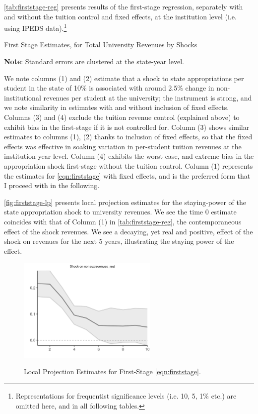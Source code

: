 \documentclass[notitlepage,12pt]{article}
\begin{document}
\autoref{tab:firststage-reg} presents results of the first-stage regression, separately with and without the tuition control and fixed effects, at the institution level (i.e. using IPEDS data).\footnote{
    Representations for frequentist significance levels (i.e. 10, 5, 1\% etc.) are omitted here, and in all following tables.
}
\begin{table}[!h]
    \onehalfspacing
    \centering
    \caption{First Stage Estimates, for Total University Revenues by Shocks}
    \makebox[\textwidth][c]{}
    \label{tab:firststage-reg}
    \begin{flushleft}
        \footnotesize
        \textbf{Note}: Standard errors are clustered at the state-year level.
    \end{flushleft}
\end{table}
We note columns (1) and (2) estimate that a shock to state appropriations per student in the state of 10\% is associated with around 2.5\% change in non-institutional revenues per student at the university; the instrument is strong, and we note similarity in estimates with and without inclusion of fixed effects.
Columns (3) and (4) exclude the tuition revenue control (explained above) to exhibit bias in the first-stage if it is not controlled for.
Column (3) shows similar estimates to columns (1), (2) thanks to inclusion of fixed effects, so that the fixed effects was effective in soaking variation in per-student tuition revenues at the institution-year level.
Column (4) exhibits the worst case, and extreme bias in the appropriation shock first-stage without the tuition control.
Column (1) represents the estimates for \autoref{eqn:firststage} with fixed effects, and is the preferred form that I proceed with in the following.

\autoref{fig:firststage-lp} presents local projection estimates for the staying-power of the state appropriation shock to university revenues.
We see the time 0 estimate coincides with that of Column (1) in \autoref{tab:firststage-reg}, the contemporaneous effect of the shock revenues.
We see a decaying, yet real and positive, effect of the shock on revenues for the next 5 years, illustrating the staying power of the effect.

\begin{figure}[h!]
    \centering
    \caption{Local Projection Estimates for First-Stage \autoref{eqn:firststage}.}
    \includegraphics[width=0.6\textwidth]{figures/firststage-lp.png}
    \label{fig:firststage-lp}
\end{figure}
\end{document}

